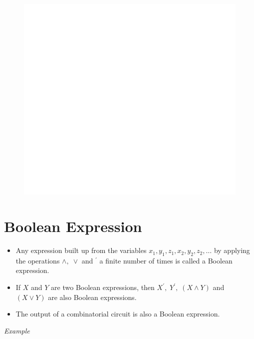 \documentclass[]{book}
\providecommand{\tightlist}{%
  \setlength{\itemsep}{0pt}\setlength{\parskip}{0pt}}
\begin{document}
\begin{figure}

{\centering \includegraphics[width=1\linewidth]{figure/boxC48-1} 

}

\end{figure}

\newpage

\hypertarget{boolean-expression}{%
\section{Boolean Expression}\label{boolean-expression}}

\begin{itemize}
\tightlist
\item
  Any expression built up from the variables \(x_1,y_1,z_1, x_2,y_2,z_2,\dots\) by applying the operations \(\land, \; \lor\) and \(^\prime\) a finite number of times is called a Boolean expression.
\item
  If \(X\) and \(Y\) are two Boolean expressions, then \(X^\prime, \;Y^\prime, \; (X\land Y)\) and \((X\lor Y)\) are also Boolean expressions.
\item
  The output of a combinatorial circuit is also a Boolean expression.
\end{itemize}

\emph{Example}
\end{document}
